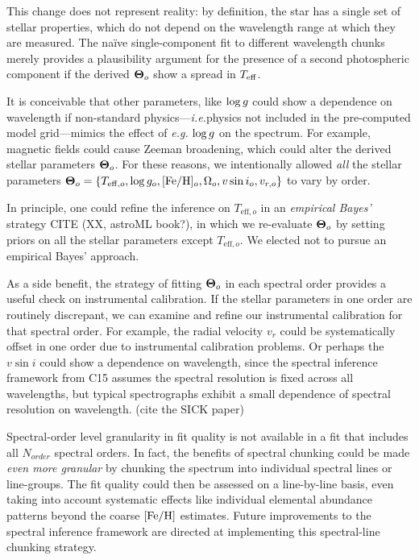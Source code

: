\documentclass[onecolumn]{emulateapj}%
\newcommand{\iancze}{{\sc C15 }}
\begin{document}
This change does not represent reality: by definition, the star has a single set of stellar properties, which do not depend on the wavelength range at which they are measured.  The na\"ive single-component fit to different wavelength chunks merely provides a plausibility argument for the presence of a second photospheric component if the derived ${\bm \Theta}_o$ show a spread in $T_\textrm{eff}$.  

It is conceivable that other parameters, like $\log g$ could show a dependence on wavelength if non-standard physics---\emph{i.e.}physics not included in the pre-computed model grid---mimics the effect of \emph{e.g.} $\log g$ on the spectrum.  For example, magnetic fields could cause Zeeman broadening, which could alter the derived stellar parameters ${\bm \Theta}_o$.  For these reasons, we intentionally allowed \emph{all} the stellar parameters ${\bm \Theta}_o = \{T_{\mathrm{eff},o}, \log{g_o}, [{\rm Fe}/{\rm H}]_o, \Omega_{o}, v\sin{i}_o, v_{r,o}\}$ to vary by order.  

In principle, one could refine the inference on $T_{\mathrm{eff},o}$ in an \emph{empirical Bayes'} strategy CITE (XX, astroML book?), in which we re-evaluate ${\bm \Theta}_o$ by setting priors on all the stellar parameters except $T_{\mathrm{eff},o}$.  We elected not to pursue an empirical Bayes' approach.

As a side benefit, the strategy of fitting ${\bm \Theta}_o$ in each spectral order provides a useful check on instrumental calibration. If the stellar parameters in one order are routinely discrepant, we can examine and refine our instrumental calibration for that spectral order.  For example, the radial velocity $v_r$ could be systematically offset in one order due to instrumental calibration problems.  Or perhaps the $v\sin{i}$ could show a dependence on wavelength, since the spectral inference framework from \iancze assumes the spectral resolution is fixed across all wavelengths, but typical spectrographs exhibit a small dependence of spectral resolution on wavelength.  (cite the SICK paper)

Spectral-order level granularity in fit quality is not available in a fit that includes all $N_{order}$ spectral orders.  In fact, the benefits of spectral chunking could be made \emph{even more granular} by chunking the spectrum into individual spectral lines or line-groups.  The fit quality could then be assessed on a line-by-line basis, even taking into account systematic effects like individual elemental abundance patterns beyond the coarse $[{\rm Fe}/{\rm H}]$ estimates.  Future improvements to the spectral inference framework are directed at implementing this spectral-line chunking strategy.  
\end{document}
